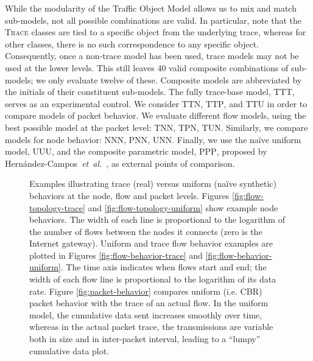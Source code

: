 \documentclass[conference]{IEEEtran}
\newcommand{\FHC}{Hern\'andez-Campos~\textit{et~al.}}
\newcommand{\class}[1]{\textsc{\small{#1}}}
\begin{document}
While the modularity of the Traffic Object Model allows us to mix and match sub-models, not all possible combinations are valid. In particular, note that the \class{Trace} classes are tied to a specific object from the underlying trace, whereas for other classes, there is no such correspondence to any specific object. Consequently, once a non-trace model has been used, trace models may not be used at the lower levels. This still leaves 40 valid composite combinations of sub-models; we only evaluate twelve of these. Composite models are abbreviated by the initials of their constituent sub-models. The fully trace-base model, \class{TTT}, serves as an experimental control. We consider \class{TTN}, \class{TTP}, and \class{TTU} in order to compare models of packet behavior. We evaluate different flow models, using the best possible model at the packet level: \class{TNN}, \class{TPN}, \class{TUN}. Similarly, we compare models for node behavior: \class{NNN}, \class{PNN}, \class{UNN}. Finally, we use the na\"ive uniform model, \class{UUU}, and the composite parametric model, \class{PPP}, proposed by {\FHC}~\cite{Hernandez06:wlan-traffic}, as external points of comparison.

\begin{figure}[tb]
\begin{center}
\caption{Examples illustrating trace (real) versus uniform (na\"ive synthetic) behaviors at the node, flow and packet levels. Figures \ref{fig:flow-topology-trace} and \ref{fig:flow-topology-uniform} show example node behaviors. The width of each line is proportional to the logarithm of the number of flows between the nodes it connects (zero is the Internet gateway). Uniform and trace flow behavior examples are plotted in Figures \ref{fig:flow-behavior-trace} and \ref{fig:flow-behavior-uniform}. The time axis indicates when flows start and end; the width of each flow line is proportional to the logarithm of its data rate. Figure \ref{fig:packet-behavior} compares uniform (i.e. {\footnotesize{CBR}}) packet behavior with the trace of an actual flow. In the uniform model, the cumulative data sent increases smoothly over time, whereas in the actual packet trace, the transmissions are variable both in size and in inter-packet interval, leading to a ``lumpy'' cumulative data plot.}
\label{fig:trace-vs-uniform}
\end{center}
\vspace{-2em}
\end{figure}
\end{document}
